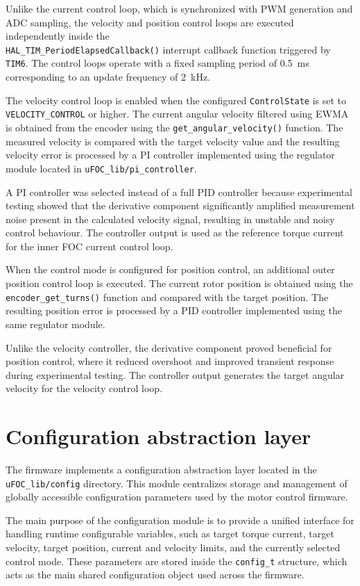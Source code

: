 Unlike the current control loop, which is synchronized with PWM generation and ADC sampling,
the velocity and position control loops are executed independently inside the\\ \texttt{HAL\_TIM\_PeriodElapsedCallback()} interrupt callback function triggered by \texttt{TIM6}.
The control loops operate with a fixed sampling period of 0.5~ms corresponding to an update frequency of 2~kHz.

The velocity control loop is enabled when the configured \texttt{ControlState} is set to \texttt{VELOCITY\_CONTROL} or higher.
The current angular velocity filtered using EWMA is obtained from the encoder using the \texttt{get\_angular\_velocity()} function.
The measured velocity is compared with the target velocity value and the resulting velocity error is processed by a 
PI controller implemented using the regulator module located in \texttt{uFOC\_lib/pi\_controller}.

A PI controller was selected instead of a full PID controller because experimental testing showed that the 
derivative component significantly amplified measurement noise present in the calculated velocity signal, resulting in unstable and noisy control behaviour.
The controller output is used as the reference torque current for the inner FOC current control loop.

When the control mode is configured for position control, an additional outer position control loop is executed.
The current rotor position is obtained using the \texttt{encoder\_get\_turns()} function and compared with the target position.
The resulting position error is processed by a PID controller implemented using the same regulator module.

Unlike the velocity controller, the derivative component proved beneficial for position control,
where it reduced overshoot and improved transient response during experimental testing.
The controller output generates the target angular velocity for the velocity control loop.


\section{Configuration abstraction layer}
The firmware implements a configuration abstraction layer located in the \texttt{uFOC\_lib/config} directory.
This module centralizes storage and management of globally accessible configuration parameters used by the motor control firmware.

The main purpose of the configuration module is to provide a unified interface for handling runtime configurable variables,
such as target torque current, target velocity, target position, current and velocity limits,
and the currently selected control mode.
These parameters are stored inside the \texttt{config\_t} structure,
which acts as the main shared configuration object used across the firmware.

